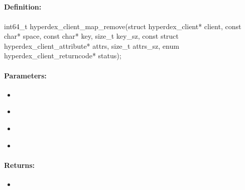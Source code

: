 \pagebreak
\subsection{}
\label{api:c:map_remove}


\paragraph{Definition:}
\begin{ccode}
int64_t hyperdex_client_map_remove(struct hyperdex_client* client,
        const char* space,
        const char* key, size_t key_sz,
        const struct hyperdex_client_attribute* attrs, size_t attrs_sz,
        enum hyperdex_client_returncode* status);
\end{ccode}

\paragraph{Parameters:}
\begin{itemize}[noitemsep]
\item {}\\

\item {}\\

\item {}\\

\item {}\\

\end{itemize}

\paragraph{Returns:}
\begin{itemize}[noitemsep]
\item {}\\

\end{itemize}

